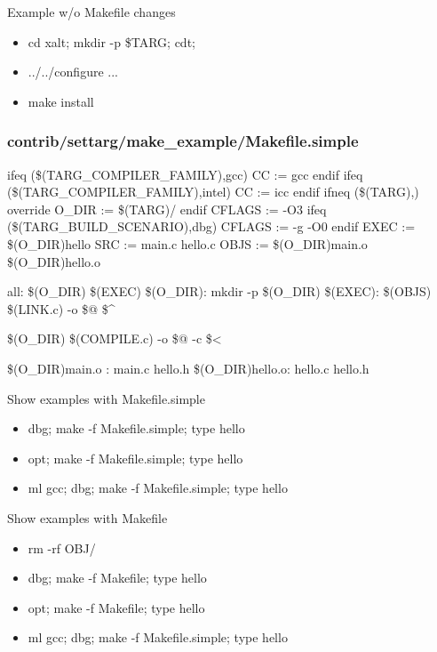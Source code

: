 \documentclass{beamer}
\begin{document}
\begin{frame}{Example w/o Makefile changes}
  \begin{itemize}
    \item cd xalt; mkdir -p \$TARG; cdt; 
    \item ../../configure ...
    \item make install
  \end{itemize}
\end{frame}

\begin{frame}[fragile]
  \frametitle{contrib/settarg/make\_example/Makefile.simple}
    {\tiny
\begin{semiverbatim}
ifeq (\$(TARG\_COMPILER\_FAMILY),gcc)
   CC := gcc
endif
ifeq (\$(TARG\_COMPILER\_FAMILY),intel)
   CC := icc
endif
ifneq (\$(TARG),)
  override O\_DIR := \$(TARG)/
endif
CFLAGS := -O3
ifeq (\$(TARG\_BUILD_SCENARIO),dbg)
   CFLAGS := -g -O0
endif 
EXEC := \$(O\_DIR)hello
SRC  := main.c hello.c
OBJS := \$(O\_DIR)main.o \$(O\_DIR)hello.o

all: \$(O\_DIR) \$(EXEC)
\$(O\_DIR):
        mkdir -p \$(O\_DIR)
\$(EXEC): \$(OBJS)
        \$(LINK.c) -o \$@ \$^

\$(O\_DIR)%
        \$(COMPILE.c) -o \$@ -c \$<

\$(O\_DIR)main.o : main.c hello.h
\$(O\_DIR)hello.o: hello.c hello.h
\end{semiverbatim}
    }
\end{frame}

\begin{frame}{Show examples with Makefile.simple }
  \begin{itemize}
    \item dbg; make -f Makefile.simple; type hello
    \item opt; make -f Makefile.simple; type hello
    \item ml gcc; dbg; make -f Makefile.simple; type hello
  \end{itemize}
\end{frame}

\begin{frame}{Show examples with Makefile }
  \begin{itemize}
    \item rm -rf OBJ/
    \item dbg; make -f Makefile; type hello
    \item opt; make -f Makefile; type hello
    \item ml gcc; dbg; make -f Makefile.simple; type hello
  \end{itemize}
\end{frame}
\end{document}
